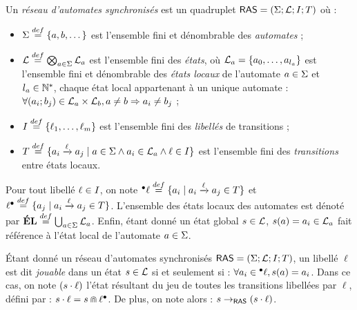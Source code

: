 \begin{definition}
  Un \emph{réseau d'automates synchronisés} est un quadruplet $\mathsf{RAS} = (\Sigma; \mathcal{L}; I; T)$
  où :
  \begin{itemize}
    \item $\Sigma \stackrel{def}= \{a, b, \dots\}$ est l'ensemble fini et dénombrable des \emph{automates} ;
    \item $\mathcal{L} \stackrel{def}= \bigotimes_{a \in \Sigma} \mathcal{L}_a$ est l'ensemble fini des \emph{états},
      où $\mathcal{L}_a = \{a_0, \ldots, a_{l_a}\}$ est l'ensemble fini et dénombrable
      des \emph{états locaux} de l'automate $a \in \Sigma$ et $l_a \in \mathbb{N}^*$,
      chaque état local appartenant à un unique automate :
      $\forall (a_i; b_j) \in \mathcal{L}_a \times \mathcal{L}_b, a \neq b \Rightarrow a_i \neq b_j$ ;
    \item $I \stackrel{def}= \{\ell_1, \dots, \ell_m\}$ est l'ensemble fini des
      \emph{libellés} de transitions ;
    \item $T \stackrel{def}= \{ a_i \xrightarrow{\ell} a_j \mid a \in \Sigma \wedge a_i \in \mathcal{L}_a \wedge
      \ell \in I \}$ est l'ensemble fini des \emph{transitions} entre états locaux.
  \end{itemize}
  Pour tout libellé $\ell \in I$, on note
  ${}^\bullet \ell \stackrel{def}= \{ a_i \mid a_i \xrightarrow{\ell} a_j \in T \}$
  et $\ell {}^\bullet \stackrel{def}= \{ a_j \mid a_i \xrightarrow{\ell} a_j \in T \}$.
  L'ensemble des états locaux des automates est dénoté par
  $\mathbf{\acute{E}L} \stackrel{def}= \bigcup_{a \in \Sigma} \mathcal{L}_a$.
  Enfin, étant donné un état global $s \in \mathcal{L}$, $s(a) = a_i \in \mathcal{L}_a$
  fait référence à l'état local de l'automate $a \in \Sigma$.
\end{definition}

\begin{definition}
  Étant donné un réseau d'automates synchronisés $\mathsf{RAS} = (\Sigma; \mathcal{L}; I; T)$,
  un libellé $\ell$ est dit \emph{jouable} dans un état $s \in \mathcal{L}$ si et seulement si :
  $\forall a_i \in {}^\bullet \ell, s(a) = a_i$.
  Dans ce cas, on note $(s \cdot \ell)$ l'état résultant du jeu de toutes les transitions
  libellées par $\ell$, défini par :
  $s \cdot \ell = s \Cap \ell {}^\bullet$.
  De plus, on note alors : $s \rightarrow_{\mathsf{RAS}} (s \cdot \ell)$.
\end{definition}

